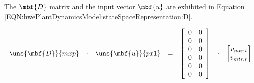 \documentclass[crop=false,float=true,class=scrreprt]{standalone}
\begin{document}
\vspace{-1em}




The $\mbf{D}$ matrix and the input vector $\mbf{u}$ are exhibited in Equation~%
\eqref{EQN:hwePlantDynamicsModel:stateSpaceRepresentation:D}.


\vspace{-1em}


\begin{equation}
\label{EQN:hwePlantDynamicsModel:stateSpaceRepresentation:D}
\begin{array}{ccccccccccccccc}
\uns{\mbf{D}}{m x p}
& \cdot &
\uns{\mbf{u}}{p x 1}
& = &
\begin{bmatrix}
\begin{array}{cccccc}
0 & 0 \\
0 & 0 \\
0 & 0 \\
0 & 0 \\
0 & 0 \\
0 & 0 \\
\end{array}
\end{bmatrix}
& \cdot &
\begin{bmatrix}
v_{mtr.l} \\
v_{mtr.r} \\
\end{bmatrix}
\end{array}
\end{equation}





\clearpage
\end{document}

